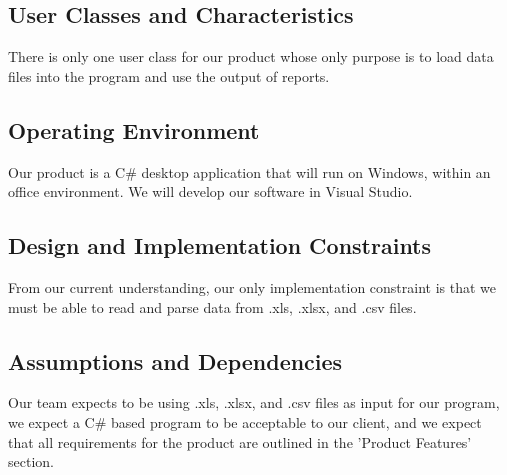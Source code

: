 \subsection{User Classes and Characteristics}
There is only one user class for our product whose only purpose is to load data files into the program and use the output of reports. 

\subsection{Operating Environment}
Our product is a C\# desktop application that will run on Windows, within an office environment. We will develop our software in Visual Studio.

\subsection{Design and Implementation Constraints}
From our current understanding, our only implementation constraint is that we must be able to read and parse data from .xls, .xlsx, and .csv files. 

\subsection{Assumptions and Dependencies}
Our team expects to be using .xls, .xlsx, and .csv files as input for our program, we expect a C\# based program to be acceptable to our client, and we expect that all requirements for the product are outlined in the 'Product Features' section.

